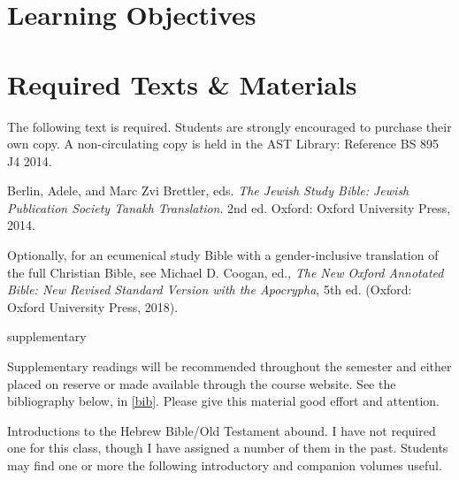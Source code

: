 \documentclass[titlepage]{article}
\newcommand\incl{../includes}
\begin{document}


  \section{Learning Objectives}
  \label{objectives}

  \edobject

\section{Required Texts \& Materials}
\label{texts}

The following text is required. Students are strongly encouraged to
purchase their own copy. A non-circulating copy is held in the AST
Library: Reference BS 895 J4 2014.

\begingroup
\renewcommand{\section}[2]{}%
\begin{thebibliography}{NJPS}%

	 Berlin, Adele, and Marc Zvi Brettler, eds.
    \emph{The Jewish Study Bible: Jewish Publication Society Tanakh Translation}.
    2nd ed. Oxford: Oxford University Press, 2014.

\end{thebibliography}
\endgroup

Optionally, for an ecumenical study Bible with a gender-inclusive
translation of the full Christian Bible, see Michael D. Coogan, ed.,
\emph{The New Oxford Annotated Bible: New Revised Standard Version with
the Apocrypha}, 5th ed. (Oxford: Oxford University Press, 2018).

\section{Supplementary Texts}
\label{supplementary}

Supplementary readings will be recommended throughout the semester and
either placed on reserve or made available through the course website.
See the bibliography below, in \autoref{bib}. Please give this material
good effort and attention.

Introductions to the Hebrew Bible/Old Testament abound. I have not
required one for this class, though I have assigned a number of them in
the past. Students may find one or more the following introductory and
companion volumes useful.
\end{document}
